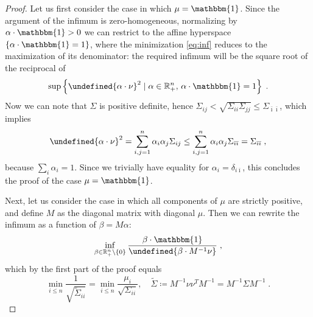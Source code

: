 \documentclass[11pt]{article}
\let\norm\undefined %
\DeclarePairedDelimiter\norm{\lVert}{\rVert}
\begin{document}
\begin{proof}
	Let us first consider the case in which $\mu = \mathbbm{1}$. Since the argument of the infimum is zero-homogeneous, normalizing by $\alpha \cdot \mathbbm{1} > 0$ we can restrict to the affine hyperspace $\{\alpha \cdot \mathbbm{1} = 1\}$, where the minimization \eqref{eq:inf} reduces to the maximization of its denominator: the required infimum will be the square root of the reciprocal of
	\begin{equation}
	\sup\left\{\norm{\alpha \cdot \nu}^2 \mid \alpha \in \mathbb{R}_{+}^n,\, \alpha \cdot \mathbbm{1} = 1\right\} \; .
	\end{equation}
	Now we can note that $\Sigma$ is positive definite, hence $\Sigma_{ij} < \sqrt{\Sigma_{ii}\Sigma_{jj}} \leq \Sigma_{\bar{\imath}\bar{\imath}}$, which implies
	\begin{equation}
	\norm{\alpha \cdot \nu}^2 = \sum_{i,j=1}^{n} \alpha_i \alpha_j \Sigma_{ij} \leq \sum_{i,j=1}^{n} \alpha_i \alpha_j \Sigma_{\bar{\imath}\bar{\imath}} = \Sigma_{\bar{\imath}\bar{\imath}} \; ,
	\end{equation}
	because $\sum_i \alpha_i = 1$. Since we trivially have equality for $\alpha_i = \delta_{i\bar{\imath}}$, this concludes the proof of the case $\mu = \mathbbm{1}$.
	
	Next, let us consider the case in which all components of $\mu$ are strictly positive, and define $M$ as the diagonal matrix with diagonal $\mu$. Then we can rewrite the infimum as a function of $\beta = M\alpha$:
	\begin{equation}
	\inf_{\beta \in \mathbb{R}_{+}^n \setminus \{0\}} \frac{\beta \cdot \mathbbm{1}}{\norm{\beta \cdot M^{-1}\nu}} \; ,
	\end{equation}
	which by the first part of the proof equals 
	\begin{equation}
	\min_{i \leq n} \frac{1}{\sqrt{\tilde{\Sigma}_{ii}}} = \min_{i \leq n} \frac{\mu_i}{\sqrt{\Sigma_{ii}}}, \quad \tilde{\Sigma} \coloneqq M^{-1}\nu\nu^{T} M^{-1} = M^{-1}\Sigma M^{-1} \; .
	\end{equation}
	

\end{proof}
\end{document}
